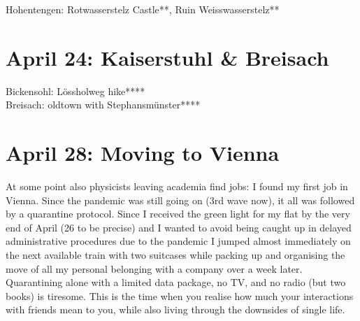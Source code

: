 Hohentengen: Rotwasserstelz Castle**, Ruin Weisswasserstelz**

\section{April 24: Kaiserstuhl \& Breisach}
\label{2021Kaiserstuhl}

Bickensohl: L\"ossholweg hike****\\
Breisach: oldtown with Stephansm\"unster****

\section{April 28: Moving to Vienna}
\label{moveVienna}

At some point also physicists leaving academia find jobs: I found my first job in Vienna. Since the pandemic was still going on (3rd wave now), it all was followed by a quarantine protocol. Since I received the green light for my flat by the very end of April (26 to be precise) and I wanted to avoid being caught up in delayed administrative procedures due to the pandemic I jumped almost immediately on the next available train with two suitcases while packing up and organising the move of all my personal belonging with a company over a week later. Quarantining alone with a limited data package, no TV, and no radio (but two books) is tiresome. This is the time when you realise how much your interactions with friends mean to you, while also living through the downsides of single life.


